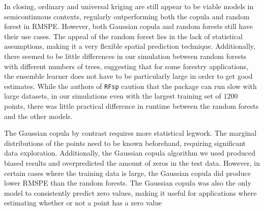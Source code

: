 \documentclass{article}
\begin{document}
In closing, ordinary and universal kriging are still appear to be viable models in semicontinuous contexts, regularly outperforming both the copula and random forest in RMSPE.
However, both Gaussian copula and random forests still have their use cases.
The appeal of the random forest lies in the lack of statistical assumptions, making it a very flexible spatial prediction technique.
Additionally, there seemed to be little differences in our simulation between random forests with different numbers of trees, suggesting that for some forestry applications, the ensemble learner does not have to be particularly large in order to get good estimates.
While the authors of \texttt{RFsp} caution that the package can run slow with large datasets, in our simulations even with the largest training set of $1200$ points, there was little practical difference in runtime between the random forests and the other models.

The Gaussian copula by contrast requires more statistical legwork.
The marginal distributions of the points need to be known beforehand, requiring significant data exploration.
Additionally, the Gaussian copula algorithm we used produced biased results and overpredicted the amount of zeros in the test data.
However, in certain cases where the training data is large, the Gaussian copula did produce lower RMSPE than the random forests.
The Gaussian copula was also the only model to consistently predict zero values, making it useful for applications where estimating whether or not a point has a zero value

\printbibliography
\end{document}
